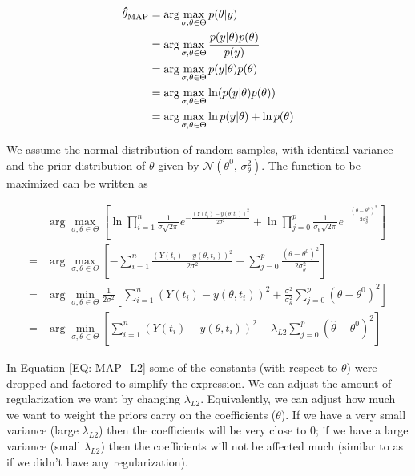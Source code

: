 \documentclass[../Article_Model_Parameters.tex]{subfiles}
\begin{document}
		{\footnotesize
			\begin{equation} 
				\begin{split} \label{EQ: MAP_probability}
					{\bf \hat{\theta}_{\text{MAP}}} &= \arg\max_{\sigma, \theta \in \Theta} p(\theta | y) \\
					&= \arg\max_{\sigma, \theta \in \Theta} \frac{p(y | \theta) p(\theta)}{p(y)} \\
					&= \arg\max_{\sigma, \theta \in \Theta} p(y | \theta) p(\theta) \\
					&= \arg\max_{\sigma, \theta \in \Theta} \ln(p(y | \theta) p(\theta)) \\
					&= \arg\max_{\sigma, \theta \in \Theta} \ln p(y | \theta) + \ln p(\theta)
				\end{split}
		\end{equation} }
		
		We assume the normal distribution of random samples, with identical variance and the prior distribution of $\theta$ given by $\mathcal{N}(\theta^0,\,\sigma_\theta^{2})$. The function to be maximized can be written as
		
		{\footnotesize
			\begin{equation} \label{EQ: MAP_L2}
				\begin{aligned}
					&\arg\max_{\sigma, \theta \in \Theta} \left[ \ln \prod_{i=1}^{n} \frac{1}{\sigma\sqrt{2\pi}}e^{-\frac{ \left( Y(t_i) - y\left( \theta, t_i \right) \right)^2 }{2\sigma^2}}
					+ \ln \prod_{j=0}^{p} \frac{1}{\sigma_\theta\sqrt{2\pi}}e^{-\frac{ \left( \theta - \theta^0 \right)^2}{2\sigma_\theta^2}} \right]  \\
					= &\arg\max_{\sigma, \theta \in \Theta} \left[- \sum_{i=1}^{n} {\frac{\left( Y(t_i) - y\left( \theta, t_i \right) \right)^2}{2\sigma^2}}
					- \sum_{j=0}^{p} {\frac{\left( \theta - \theta^0 \right)^2}{2\sigma_\theta^2}} \right]\\
					= &\arg\min_{\sigma, \theta \in \Theta} \frac{1}{2\sigma^2} \left[ \sum_{i=1}^{n} \left( Y(t_i) - y\left( \theta, t_i \right) \right)^2
					+ \frac{\sigma^2}{\sigma_\theta^2} \sum_{j=0}^{p} \left( \theta - \theta^0 \right)^2 \right] \\
					= &\arg\min_{\sigma, \theta \in \Theta} \left[ \sum_{i=1}^{n} \left( Y(t_i) - y\left( \theta, t_i \right) \right)^2 + \lambda_{L2} \sum_{j=0}^{p} \left( \hat{\theta} - \theta^0 \right)^2 \right]
				\end{aligned}
		\end{equation} }
		
		In Equation \ref{EQ: MAP_L2} some of the constants (with respect to $\theta$) were dropped and factored to simplify the expression. We can adjust the amount of regularization we want by changing $\lambda_{L2}$. Equivalently, we can adjust how much we want to weight the priors carry on the coefficients ($\theta$). If we have a very small variance (large $\lambda_{L2}$) then the coefficients will be very close to 0; if we have a large variance (small $\lambda_{L2}$) then the coefficients will not be affected much (similar to as if we didn't have any regularization).
		
\end{document}
